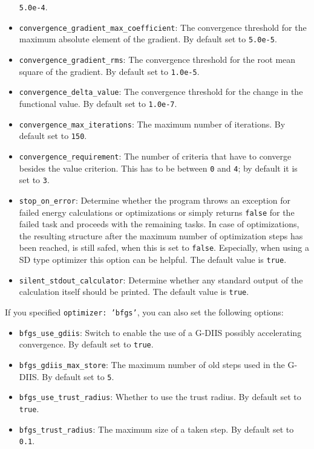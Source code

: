 \documentclass[]{tufte-book}
\begin{document}
\begin{itemize}
\texttt{5.0e-4}.
\item \texttt{convergence\_gradient\_max\_coefficient}: The convergence threshold for the maximum absolute element of the gradient.
By default set to \texttt{5.0e-5}.
\item \texttt{convergence\_gradient\_rms}: The convergence threshold for the root mean square of the gradient. By default set to
\texttt{1.0e-5}.
\item \texttt{convergence\_delta\_value}: The convergence threshold for the change in the functional value. By default set to
\texttt{1.0e-7}.
\item \texttt{convergence\_max\_iterations}: The maximum number of iterations. By default set to \texttt{150}.
\item \texttt{convergence\_requirement}: The number of criteria that have to converge besides the value criterion. This
has to be between \texttt{0} and \texttt{4}; by default it is set to \texttt{3}.
\item \texttt{stop\_on\_error}: Determine whether the program throws an exception for failed energy calculations or optimizations or simply returns \texttt{false} for the failed task and proceeds with the remaining tasks. In case of optimizations, the resulting structure after the maximum number of optimization steps has been reached, is still safed, when this is set to \texttt{false}. Especially, when using a SD type optimizer this option can be helpful. The default value is \texttt{true}.
\item \texttt{silent\_stdout\_calculator}: Determine whether any standard output of the calculation itself should be printed. The default value is \texttt{true}.
\end{itemize}

If you specified \texttt{optimizer: 'bfgs'}, you can also set the following options:
\begin{itemize}
\item \texttt{bfgs\_use\_gdiis}: Switch to enable the use of a G-DIIS possibly accelerating convergence. By default set to
\texttt{true}.
\item \texttt{bfgs\_gdiis\_max\_store}: The maximum number of old steps used in the G-DIIS. By default set to \texttt{5}.
\item \texttt{bfgs\_use\_trust\_radius}: Whether to use the trust radius. By default set to \texttt{true}.
\item \texttt{bfgs\_trust\_radius}: The maximum size of a taken step. By default set to \texttt{0.1}.
\end{itemize}
\end{document}

